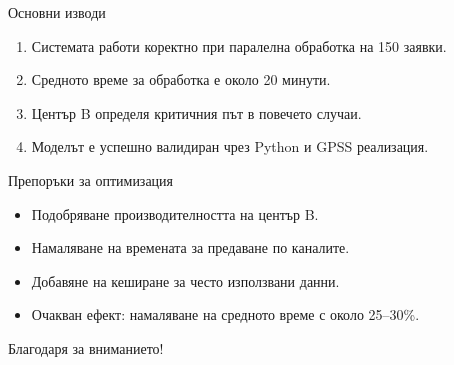 \documentclass[aspectratio=169]{beamer}
\begin{document}
\begin{frame}{Основни изводи}
    \begin{enumerate}
        \item Системата работи коректно при паралелна обработка на 150 заявки.
        \item Средното време за обработка е около 20 минути.
        \item Център B определя критичния път в повечето случаи.
        \item Моделът е успешно валидиран чрез Python и GPSS реализация.
    \end{enumerate}
\end{frame}

\begin{frame}{Препоръки за оптимизация}
    \begin{itemize}
        \item Подобряване производителността на център B.
        \item Намаляване на времената за предаване по каналите.
        \item Добавяне на кеширане за често използвани данни.
        \item Очакван ефект: намаляване на средното време с около 25--30\%.
    \end{itemize}
\end{frame}

\begin{frame}
    \centering
    \Large Благодаря за вниманието!
\end{frame}
\end{document}
